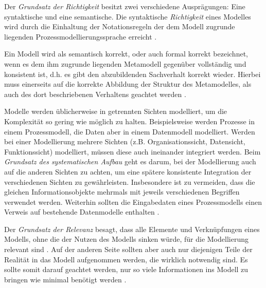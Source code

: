 Der \textit{Grundsatz der Richtigkeit} besitzt zwei verschiedene Ausprägungen: Eine syntaktische und eine semantische. Die syntaktische \textit{Richtigkeit} eines Modelles wird durch die Einhaltung der Notationsregeln der dem Modell zugrunde liegenden Prozessmodellierungssprache erreicht \cite{journals95, becker2012prozessmanagement}. \newline

Ein Modell wird als semantisch korrekt, oder auch formal korrekt bezeichnet, wenn es dem ihm zugrunde liegenden Metamodell gegenüber vollständig und konsistent ist, d.h. es gibt den abzubildenden Sachverhalt korrekt wieder. Hierbei muss einerseits auf die korrekte Abbildung der Struktur des Metamodelles, als auch des dort beschriebenen Verhaltens geachtet werden \cite{journals95, becker2012prozessmanagement}. \newline


Modelle werden üblicherweise in getrennten Sichten modelliert, um die Komplexität so gering wie möglich zu halten. Beispielsweise werden Prozesse in einem Prozessmodell, die Daten aber in einem Datenmodell modelliert. Werden bei einer Modellierung mehrere Sichten (z.B. Organisationssicht, Datensicht, Funktionssicht) modelliert, müssen diese auch ineinander integriert werden. Beim \textit{Grundsatz des systematischen Aufbau} geht es darum, bei der Modellierung auch auf die anderen Sichten zu achten, um eine spätere konsistente Integration der verschiedenen Sichten zu gewährleisten. Insbesondere ist zu vermeiden, dass die gleichen Informationsobjekte mehrmals mit jeweils verschiedenen Begriffen verwendet werden. Weiterhin sollten die Eingabedaten eines Prozessmodells einen Verweis auf bestehende Datenmodelle enthalten \cite{journals95, freund2007, becker2012prozessmanagement,koch2011}.\newline

Der \textit{Grundsatz der Relevanz} besagt, dass alle Elemente und Verknüpfungen eines Modells, ohne die der Nutzen des Modells sinken würde, für die Modellierung relevant sind \cite{journals95, reinshagen2009}. Auf der anderen Seite sollten aber auch nur diejenigen Teile der Realität in das Modell aufgenommen werden, die wirklich notwendig sind. Es sollte somit darauf geachtet werden, nur so viele Informationen ins Modell zu bringen wie minimal benötigt werden \cite{journals95, freund2007,reinshagen2009}.\newline


